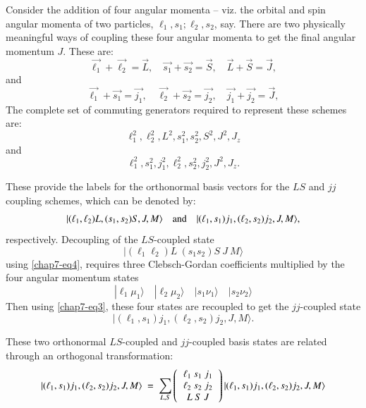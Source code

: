 Consider the addition of four angular momenta -- viz. the orbital and spin angular momenta of two particles, $\ell_1, s_1; \ell_2, s_2$, say. There are two physically meaningful ways of coupling these four angular momenta to get the final angular momentum $J$. These are:
\begin{equation}
\vec{\ell_1}+\vec{\ell_2} = \vec{L},\quad \vec{s_1}+\vec{s_2} = \vec{S},\quad \vec{L}+\vec{S} = \vec{J},\label{chap7-eq44}
\end{equation}
and 
\begin{equation}
\vec{\ell_1}+\vec{s_1} = \vec{j_1},\quad \vec{\ell_2}+\vec{s_2} = \vec{j_2},\quad \vec{j_1}+\vec{j_2} = \vec{J},\label{chap7-eq45}
\end{equation}
The complete set of commuting generators required to represent these schemes are:
\begin{equation}
\ell_1^2, \ell_2^2, L^2, s_1^2, s_2^2, S^2, J^2, J_z \label{chap7-eq46}
\end{equation}
and
\begin{equation}
\ell_1^2, s_1^2, j_1^2, \ell_2^2, s_2^2, j_2^2, J^2, J_z. \label{chap7-eq47}
\end{equation}

These provide the labels for the orthonormal basis vectors for the $LS$ and $jj$ coupling schemes, which can be denoted by:
\begin{equation}
|(\ell_1, \ell_2) L, (s_1, s_2) S, J, M\rangle \quad {\rm and} \quad |(\ell_1, s_1) j_1, (\ell_2, s_2) j_2, J, M\rangle ,\label{chap7-eq48}
\end{equation}
respectively. Decoupling  of the $LS$-coupled state
\begin{equation*}
|(\ell_1 \ell_2) L\ (s_1 s_2) S\ J\ M \rangle \label{chap7-eq48a}
\end{equation*}
using \eqref{chap7-eq4}, requires three Clebsch-Gordan coefficients multiplied by the four angular momentum states
\begin{equation}
|\ell_1 \mu_1 \rangle \quad |\ell_2 \mu_2 \rangle \quad |s_1 \nu_1 \rangle \quad  |s_2 \nu_2 \rangle \label{chap7-eq49}
\end{equation}
Then using \eqref{chap7-eq3}, these four states are recoupled to get the $jj$-coupled state  
\begin{equation*}
|(\ell_1, s_1) j_1, (\ell_2, s_2) j_2, J, M\rangle.\label{chap7-eq48b}
\end{equation*}

These two orthonormal $LS$-coupled and $jj$-coupled basis states are related through an orthogonal transformation:
\begin{equation}
|(\ell_1, s_1) j_1, (\ell_2, s_2) j_2, J, M\rangle \ =\ 
\sum_{L,S} 
\left(
\begin{tabular}{c}
$\ell_1 \ s_1 \ j_1$\\   
$\ell_2 \ s_2 \ j_2$\\ 
$L \ S \ J$\\ 
\end{tabular}
\right)
|(\ell_1, s_1) j_1, (\ell_2, s_2) j_2, J, M\rangle  \label{chap7-eq50}
\end{equation}


